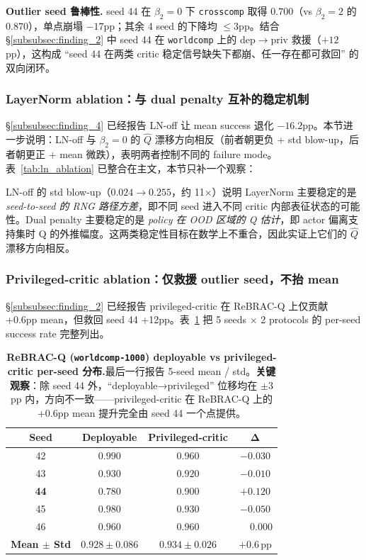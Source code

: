 \textbf{Outlier seed 鲁棒性.}\quad
seed 44 在 $\beta_2=0$ 下 \texttt{crosscomp} 取得 $0.700$（vs $\beta_2=2$ 的 $0.870$），单点崩塌 $-17$pp；其余 4 seed 的下降均 $\leq 3$pp。结合 \S\ref{subsubsec:finding_2} 中 seed 44 在 \texttt{worldcomp} 上的 dep$\to$priv 救援（$+12$pp），这构成 ``seed 44 在两类 critic 稳定信号缺失下都崩、任一存在都可救回'' 的双向闭环。

\subsubsection{LayerNorm ablation：与 dual penalty 互补的稳定机制}
\label{subsubsec:ln_ablation}

\S\ref{subsubsec:finding_4} 已经报告 LN-off 让 mean success 退化 $-16.2$pp。本节进一步说明：LN-off 与 $\beta_2=0$ 的 $\hat{Q}$ 漂移方向相反（前者朝更负 + std blow-up，后者朝更正 + mean 微跌），表明两者控制不同的 failure mode。表~\ref{tab:ln_ablation} 已整合在主文，本节只补一个观察：

LN-off 的 std blow-up（$0.024 \to 0.255$，约 11$\times$）说明 LayerNorm 主要稳定的是 \emph{seed-to-seed 的 RNG 路径方差}，即不同 seed 进入不同 critic 内部表征状态的可能性。Dual penalty 主要稳定的是 \emph{policy 在 OOD 区域的 Q 估计}，即 actor 偏离支持集时 Q 的外推幅度。这两类稳定性目标在数学上不重合，因此实证上它们的 $\hat{Q}$ 漂移方向相反。

\subsubsection{Privileged-critic ablation：仅救援 outlier seed，不抬 mean}
\label{subsubsec:privileged_ablation}

\S\ref{subsubsec:finding_2} 已经报告 privileged-critic 在 ReBRAC-Q 上仅贡献 +0.6pp mean，但救回 seed 44 +12pp。表~\ref{tab:privileged_breakdown} 把 5 seeds $\times$ 2 protocols 的 per-seed success rate 完整列出。

\begin{table}[t]
\centering
\small
\caption{\textbf{ReBRAC-Q (\texttt{worldcomp-1000}) deployable vs privileged-critic per-seed 分布.}最后一行报告 5-seed mean / std。\textbf{关键观察}：除 seed 44 外，``deployable→privileged'' 位移均在 $\pm 3$pp 内，方向不一致——privileged-critic 在 ReBRAC-Q 上的 +0.6pp mean 提升完全由 seed 44 一个点提供。}
\label{tab:privileged_breakdown}
\begin{tabular}{cccc}
\toprule
\textbf{Seed} & \textbf{Deployable} & \textbf{Privileged-critic} & $\boldsymbol{\Delta}$ \\
\midrule
42 & $0.990$ & $0.960$ & $-0.030$ \\
43 & $0.930$ & $0.920$ & $-0.010$ \\
\textbf{44} & $\mathbf{0.780}$ & $\mathbf{0.900}$ & $\mathbf{+0.120}$ \\
45 & $0.980$ & $0.930$ & $-0.050$ \\
46 & $0.960$ & $0.960$ & $\phantom{+}0.000$ \\
\midrule
\textbf{Mean $\pm$ Std} & $0.928 \pm 0.086$ & $0.934 \pm 0.026$ & $+0.6$\,pp \\
\bottomrule
\end{tabular}
\end{table}

